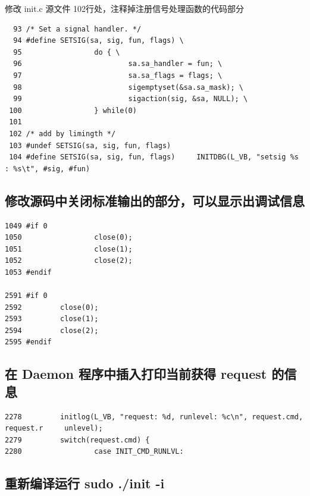 修改 init.c 源文件 102行处，注释掉注册信号处理函数的代码部分

{\begin{shaded}\begin{verbatim}
  93 /* Set a signal handler. */
  94 #define SETSIG(sa, sig, fun, flags) \
  95                 do { \
  96                         sa.sa_handler = fun; \
  97                         sa.sa_flags = flags; \
  98                         sigemptyset(&sa.sa_mask); \
  99                         sigaction(sig, &sa, NULL); \
 100                 } while(0)
 101 
 102 /* add by limingth */
 103 #undef SETSIG(sa, sig, fun, flags)
 104 #define SETSIG(sa, sig, fun, flags)     INITDBG(L_VB, "setsig %s : %s\t", #sig, #fun)
\end{verbatim}\end{shaded}}
\subsection{修改源码中关闭标准输出的部分，可以显示出调试信息}

{\begin{shaded}\begin{verbatim}
1049 #if 0
1050                 close(0);
1051                 close(1);
1052                 close(2);
1053 #endif

2591 #if 0
2592         close(0);
2593         close(1);
2594         close(2);
2595 #endif
\end{verbatim}\end{shaded}}
\subsection{在 Daemon 程序中插入打印当前获得 request 的信息}

{\begin{shaded}\begin{verbatim}
2278         initlog(L_VB, "request: %d, runlevel: %c\n", request.cmd, request.r     unlevel);
2279         switch(request.cmd) {
2280                 case INIT_CMD_RUNLVL:
\end{verbatim}\end{shaded}}
\subsection{重新编译运行 sudo ./init -i}

